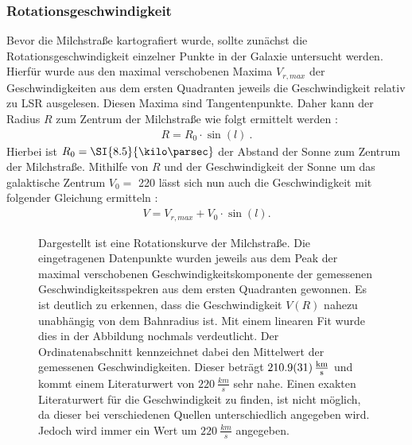 \subsubsection{Rotationsgeschwindigkeit}
Bevor die Milchstraße kartografiert wurde, sollte zunächst die Rotationsgeschwindigkeit einzelner Punkte in der Galaxie untersucht werden. Hierfür wurde aus den maximal verschobenen Maxima $V_{r,max}$ der Geschwindigkeiten aus dem ersten Quadranten jeweils die Geschwindigkeit relativ zu LSR ausgelesen. Diesen Maxima sind Tangentenpunkte. Daher kann der Radius $R$ zum Zentrum der Milchstraße wie folgt ermittelt werden \cite{H1}:
\begin{align}
    R = R_0 \cdot \sin(l) \ .
    \label{eq:TangenteR}
\end{align}
Hierbei ist $R_0 = \SI{8.5}{\kilo \parsec}$ der Abstand der Sonne zum Zentrum der Milchstraße. Mithilfe von $R$ und der Geschwindigkeit der Sonne um das galaktische Zentrum $V_0 = $ \SI{220}{} lässt sich nun auch die Geschwindigkeit mit folgender Gleichung ermitteln \cite{H1}:
\begin{align}
    V = V_{r,max} + V_0 \cdot \sin(l) .
    \label{eq:V(R)}
\end{align}

\begin{figure}[H]
    \centering
    \resizebox{0.8\textwidth}{!}{}
    \caption[Rotationskurve der Milchstraße]{Dargestellt ist eine Rotationskurve der Milchstraße. Die eingetragenen Datenpunkte wurden jeweils aus dem Peak der maximal verschobenen Geschwindigkeitskomponente der gemessenen Geschwindigkeitsspekren aus dem ersten Quadranten gewonnen. Es ist deutlich zu erkennen, dass die Geschwindigkeit $V(R)$ nahezu unabhängig von dem Bahnradius ist. Mit einem linearen Fit wurde dies in der Abbildung nochmals verdeutlicht. Der Ordinatenabschnitt kennzeichnet dabei den Mittelwert der gemessenen Geschwindigkeiten. Dieser beträgt $\SI{210.9 \pm 3.1}{\frac{km}{s}}$ und kommt einem Literaturwert von $\SI{220}{\frac{km}{s}}$ \cite{LSR} sehr nahe. Einen exakten Literaturwert für die Geschwindigkeit zu finden, ist nicht möglich, da dieser bei verschiedenen Quellen unterschiedlich angegeben wird. Jedoch wird immer ein Wert um $\SI{220}{\frac{km}{s}}$ angegeben.}
    \label{fig:VvonR}
\end{figure}

